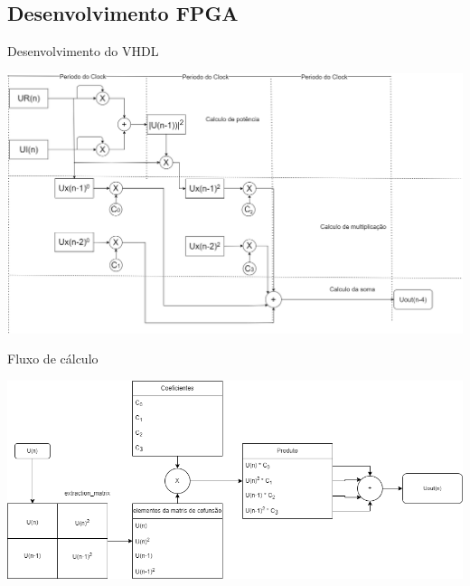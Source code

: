 \documentclass{if-beamer}
\begin{document}
\subsection{Desenvolvimento FPGA}
\begin{frame}[c]{Desenvolvimento do VHDL} %
	\begin{center}
		\includegraphics[scale=0.2]{diagrama_process.png}
	\end{center}
\end{frame}
\begin{frame}[c]{Fluxo de cálculo}
		\begin{center}
	\includegraphics[scale=0.25]{fluxo_de_calculo.png}
\end{center}
\end{frame}
\end{document}
